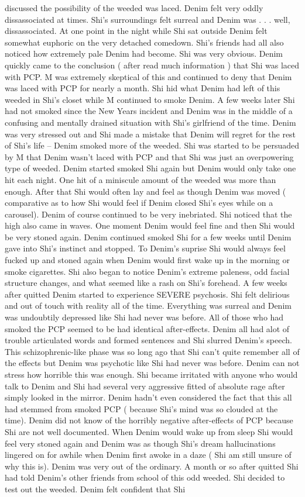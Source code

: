 \documentclass[12pt]{book}
\begin{document}
discussed the possibility of the weeded was laced. Denim felt very oddly dissassociated at times. Shi's surroundings felt surreal and Denim was . . .  well, dissassociated. At one point in the night while Shi sat outside Denim felt somewhat euphoric on the very detached comedown. Shi's friends had all also noticed how extremely pale Denim had become. Shi was very obvious. Denim quickly came to the conclusion ( after read much information ) that Shi was laced with PCP. M was extremely skeptical of this and continued to deny that Denim was laced with PCP for nearly a month. Shi hid what Denim had left of this weeded in Shi's closet while M continued to smoke Denim. A few weeks later Shi had not smoked since the New Years incident and Denim was in the middle of a confusing and mentally drained situation with Shi's girlfriend of the time. Denim was very stressed out and Shi made a mistake that Denim will regret for the rest of Shi's life -- Denim smoked more of the weeded. Shi was started to be persuaded by M that Denim wasn't laced with PCP and that Shi was just an overpowering type of weeded. Denim started smoked Shi again but Denim would only take one hit each night. One hit of a miniscule amount of the weeded was more than enough. After that Shi would often lay and feel as though Denim was moved ( comparative as to how Shi would feel if Denim closed Shi's eyes while on a carousel). Denim of course continued to be very inebriated. Shi noticed that the high also came in waves. One moment Denim would feel fine and then Shi would be very stoned again. Denim continued smoked Shi for a few weeks until Denim gave into Shi's instinct and stopped. To Denim's suprise Shi would always feel fucked up and stoned again when Denim would first wake up in the morning or smoke cigarettes. Shi also began to notice Denim's extreme paleness, odd facial structure changes, and what seemed like a rash on Shi's forehead. A few weeks after quitted Denim started to experience SEVERE psychosis. Shi felt delirious and out of touch with reality all of the time. Everything was surreal and Denim was undoubtily depressed like Shi had never was before. All of those who had smoked the PCP seemed to be had identical after-effects. Denim all had alot of trouble articulated words and formed sentences and Shi slurred Denim's speech. This schizophrenic-like phase was so long ago that Shi can't quite remember all of the effects but Denim was psychotic like Shi had never was before. Denim can not stress how horrible this was enough. Shi became irritated with anyone who would talk to Denim and Shi had several very aggressive fitted of absolute rage after simply looked in the mirror. Denim hadn't even considered the fact that this all had stemmed from smoked PCP ( because Shi's mind was so clouded at the time). Denim did not know of the horribly negative after-effects of PCP because Shi are not well documented. When Denim would wake up from sleep Shi would feel very stoned again and Denim was as though Shi's dream hallucinations lingered on for awhile when Denim first awoke in a daze ( Shi am still unsure of why this is). Denim was very out of the ordinary. A month or so after quitted Shi had told Denim's other friends from school of this odd weeded. Shi decided to test out the weeded. Denim felt confident that Shi 
\end{document}
